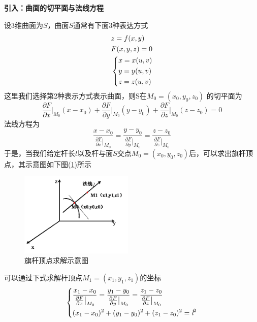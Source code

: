             \par
            \textbf{引入：曲面的切平面与法线方程}
            \par
            设3维曲面为$S$，曲面$S$通常有下面3种表达方式
            \begin{align}
             & z =f(x,y)\\
             & F(x,y,z) =0\\
             & \left\{
             \begin{lgathered}
             x=x(u,v)\\
             y=y(u,v)\\
             z=z(u,v)
             \end{lgathered} \right.
            \end{align}
            这里我们选择第2种表示方式表示曲面，则S在$M_0=(x_0,y_0,z_0)$ 的切平面为
            \begin{equation*}
             \frac{\partial F}{\partial x}\Big|_{M_0} (x-x_0)+\frac{\partial F}{\partial y}\Big|_{M_0} (y-y_0)+\frac{\partial F}{\partial z}\Big|_{M_0} (z-z_0)=0
            \end{equation*}
            法线方程为
            \begin{equation*}
            \frac{x-x_0}{ \frac{\partial F}{\partial x}\big|_{M_0} }=\frac{y-y_0}{\frac{\partial F}{\partial y}\big|_{M_0} }=\frac{z-z_0}{\frac{\partial F}{\partial z}\big|_{M_0} }
            \end{equation*}
            于是，当我们给定杆长$l$以及杆与面$S$交点$M_0=(x_0,y_0,z_0)$后，可以求出旗杆顶点，其示意图如下图(\ref{旗杆顶点求解示意图})所示
            \begin{figure}[H]
            \centering
            \includegraphics[height=4cm]{images/6.jpg}
            \caption{旗杆顶点求解示意图}
            \label{旗杆顶点求解示意图}
            \end{figure}
            可以通过下式求解杆顶点$M_1=(x_1,y_1,z_1)$的坐标
            \begin{equation*}
            \left\{\begin{lgathered}
            \frac{x_1-x_0}{ \frac{\partial F}{\partial x}\big|_{M_0} }=\frac{y_1-y_0}{\frac{\partial F}{\partial y}\big|_{M_0} }=\frac{z_1-z_0}{\frac{\partial F}{\partial z}\big|_{M_0} }\\
            (x_1-x_0)^2+(y_1-y_0)^2+(z_1-z_0)^2={\textit{l}}^2
            \end{lgathered} \right.
            \end{equation*}
